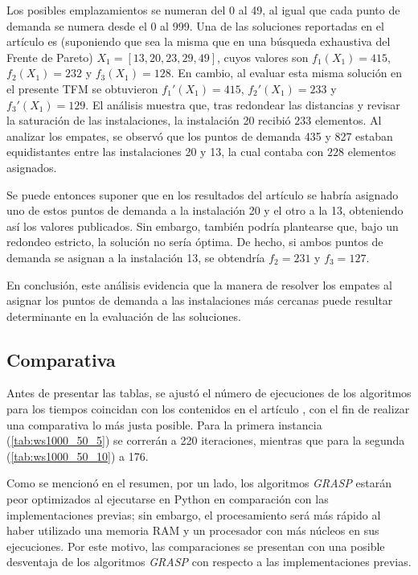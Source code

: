 \documentclass[12pt,a4paper]{book}
\begin{document}
Los posibles emplazamientos se numeran del 0 al 49, al igual que cada punto de demanda se numera desde el 0 al 999. Una de las soluciones reportadas en el artículo es (suponiendo que sea la misma que en una búsqueda exhaustiva del Frente de Pareto) $X_1 = [13, 20, 23, 29, 49]$, cuyos valores son $f_1(X_1) = 415$, $f_2(X_1) = 232$ y $f_3(X_1) = 128$. En cambio, al evaluar esta misma solución en el presente TFM se obtuvieron $f_1'(X_1) = 415$, $f_2'(X_1) = 233$ y $f_3'(X_1) = 129$.
El análisis muestra que, tras redondear las distancias y revisar la saturación de las instalaciones, la instalación 20 recibió $233$ elementos. Al analizar los empates, se observó que los puntos de demanda 435 y 827 estaban equidistantes entre las instalaciones 20 y 13, la cual contaba con $228$ elementos asignados.

Se puede entonces suponer que en los resultados del artículo se habría asignado uno de estos puntos de demanda a la instalación 20 y el otro a la 13, obteniendo así los valores publicados. Sin embargo, también podría plantearse que, bajo un redondeo estricto, la solución no sería óptima.
De hecho, si ambos puntos de demanda se asignan a la instalación 13, se obtendría $f_2 = 231$ y $f_3 = 127$.

En conclusión, este análisis evidencia que la manera de resolver los empates al asignar los puntos de demanda a las instalaciones más cercanas puede resultar determinante en la evaluación de las soluciones.

\subsection{Comparativa}

Antes de presentar las tablas, se ajustó el número de ejecuciones de los algoritmos para los tiempos coincidan con los contenidos en el artículo \cite{k-balanced_1}, con el fin de realizar una comparativa lo más justa posible. Para la primera instancia (\ref{tab:ws1000_50_5}) se correrán a 220 iteraciones, mientras que para la segunda (\ref{tab:ws1000_50_10}) a 176.

Como se mencionó en el resumen, por un lado, los algoritmos \textit{GRASP} estarán peor optimizados al ejecutarse en 
Python en comparación con las implementaciones previas; sin embargo, el procesamiento será más rápido al haber utilizado una memoria RAM y un procesador con más núcleos en sus ejecuciones. Por este motivo, las comparaciones se presentan con una posible desventaja de los algoritmos \textit{GRASP} con respecto a las implementaciones previas.
\end{document}
